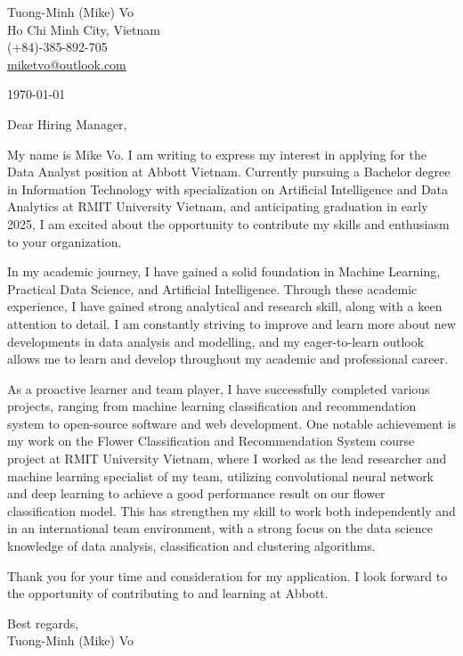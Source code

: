 \documentclass[a4paper,11pt]{article}
\makeatletter
\newcommand{\header}{
    \small{
        Tuong-Minh (Mike) Vo\\
        Ho Chi Minh City, Vietnam\\
        (+84)-385-892-705\\
        \href{miketvo@outlook.com}{miketvo@outlook.com}
    }
    \par\noindent\hrulefill
}
\newcommand{\p}[1]{#1\\\vspace{6pt}}
\makeatother
\begin{document}
\header

\p{\today}

\p{Dear Hiring Manager,}

\p{My name is Mike Vo. I am writing to express my interest in applying for the Data Analyst position at Abbott Vietnam. Currently pursuing a Bachelor degree in Information Technology with specialization on Artificial Intelligence and Data Analytics at RMIT University Vietnam, and anticipating graduation in early 2025, I am excited about the opportunity to contribute my skills and enthusiasm to your organization.}

\p{In my academic journey, I have gained a solid foundation in Machine Learning, Practical Data Science, and Artificial Intelligence. Through these academic experience, I have gained strong analytical and research skill, along with a keen attention to detail. I am constantly striving to improve and learn more about new developments in data analysis and modelling, and my eager-to-learn outlook allows me to learn and develop throughout my academic and professional career.}

\p{As a proactive learner and team player, I have successfully completed various projects, ranging from machine learning classification and recommendation system to open-source software and web development. One notable achievement is my work on the Flower Classification and Recommendation System course project at RMIT University Vietnam, where I worked as the lead researcher and machine learning specialist of my team, utilizing convolutional neural network and deep learning to achieve a good performance result on our flower classification model. This has strengthen my skill to work both independently and in an international team environment, with a strong focus on the data science knowledge of data analysis, classification and clustering algorithms.}

\p{Thank you for your time and consideration for my application. I look forward to the opportunity of contributing to and learning at Abbott.}

\p{Best regards,\\
Tuong-Minh (Mike) Vo}
\end{document}
